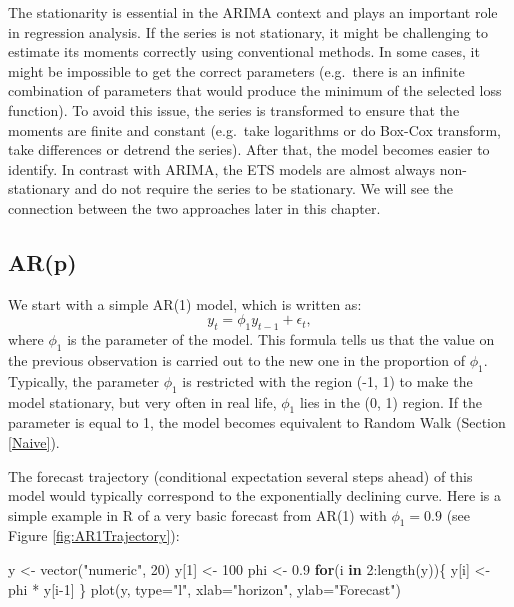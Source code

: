 \documentclass[
]{book}
\newenvironment{Shaded}{\begin{snugshade}}{\end{snugshade}}
\newcommand{\AttributeTok}[1]{\textcolor[rgb]{0.77,0.63,0.00}{#1}}
\newcommand{\ControlFlowTok}[1]{\textcolor[rgb]{0.13,0.29,0.53}{\textbf{#1}}}
\newcommand{\DecValTok}[1]{\textcolor[rgb]{0.00,0.00,0.81}{#1}}
\newcommand{\FloatTok}[1]{\textcolor[rgb]{0.00,0.00,0.81}{#1}}
\newcommand{\FunctionTok}[1]{\textcolor[rgb]{0.00,0.00,0.00}{#1}}
\newcommand{\NormalTok}[1]{#1}
\newcommand{\OtherTok}[1]{\textcolor[rgb]{0.56,0.35,0.01}{#1}}
\newcommand{\SpecialCharTok}[1]{\textcolor[rgb]{0.00,0.00,0.00}{#1}}
\newcommand{\StringTok}[1]{\textcolor[rgb]{0.31,0.60,0.02}{#1}}
\theoremstyle{definition}
\theoremstyle{definition}
\theoremstyle{definition}
\theoremstyle{definition}
\theoremstyle{remark}
\begin{document}
The stationarity is essential in the ARIMA context and plays an important role in regression analysis. If the series is not stationary, it might be challenging to estimate its moments correctly using conventional methods. In some cases, it might be impossible to get the correct parameters (e.g.~there is an infinite combination of parameters that would produce the minimum of the selected loss function). To avoid this issue, the series is transformed to ensure that the moments are finite and constant (e.g.~take logarithms or do Box-Cox transform, take differences or detrend the series). After that, the model becomes easier to identify. In contrast with ARIMA, the ETS models are almost always non-stationary and do not require the series to be stationary. We will see the connection between the two approaches later in this chapter.

\hypertarget{AR}{%
\subsection{AR(p)}\label{AR}}

We start with a simple AR(1) model, which is written as:
\begin{equation}
  {y}_{t} = \phi_1 y_{t-1} + \epsilon_t ,
  \label{eq:ARIMA100Example}
\end{equation}
where \(\phi_1\) is the parameter of the model. This formula tells us that the value on the previous observation is carried out to the new one in the proportion of \(\phi_1\). Typically, the parameter \(\phi_1\) is restricted with the region (-1, 1) to make the model stationary, but very often in real life, \(\phi_1\) lies in the (0, 1) region. If the parameter is equal to 1, the model becomes equivalent to Random Walk (Section \ref{Naive}).

The forecast trajectory (conditional expectation several steps ahead) of this model would typically correspond to the exponentially declining curve. Here is a simple example in R of a very basic forecast from AR(1) with \(\phi_1=0.9\) (see Figure \ref{fig:AR1Trajectory}):

\begin{Shaded}
\begin{Highlighting}[]
\NormalTok{y }\OtherTok{\textless{}{-}} \FunctionTok{vector}\NormalTok{(}\StringTok{"numeric"}\NormalTok{, }\DecValTok{20}\NormalTok{)}
\NormalTok{y[}\DecValTok{1}\NormalTok{] }\OtherTok{\textless{}{-}} \DecValTok{100}
\NormalTok{phi }\OtherTok{\textless{}{-}} \FloatTok{0.9}
\ControlFlowTok{for}\NormalTok{(i }\ControlFlowTok{in} \DecValTok{2}\SpecialCharTok{:}\FunctionTok{length}\NormalTok{(y))\{}
\NormalTok{    y[i] }\OtherTok{\textless{}{-}}\NormalTok{ phi }\SpecialCharTok{*}\NormalTok{ y[i}\DecValTok{{-}1}\NormalTok{]}
\NormalTok{\}}
\FunctionTok{plot}\NormalTok{(y, }\AttributeTok{type=}\StringTok{"l"}\NormalTok{, }\AttributeTok{xlab=}\StringTok{"horizon"}\NormalTok{, }\AttributeTok{ylab=}\StringTok{"Forecast"}\NormalTok{)}
\end{Highlighting}
\end{Shaded}
\end{document}
